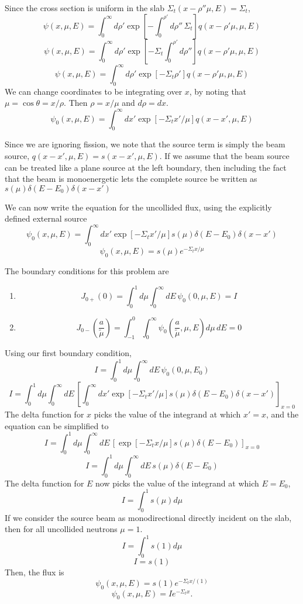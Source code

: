 \documentclass{article}
\newcommand{\Xs}{\Sigma}
\newcommand{\intzi}{\int_0^{\infty}}
\begin{document}
Since the cross section is uniform in the slab $\Xs_t(x-\rho''\mu,E) = \Xs_t$,
$$ \psi(x,\mu,E) = \intzi d\rho' \exp \left[ -\int_0^{\rho'} d\rho'' \, \Xs_t\right] q(x-\rho'\mu,\mu,E) $$
$$ \psi(x,\mu,E) = \intzi d\rho' \exp \left[ -\Xs_t \int_0^{\rho'} d\rho''\right] q(x-\rho'\mu,\mu,E) $$
$$ \psi(x,\mu,E) = \intzi d\rho' \exp \left[ -\Xs_t \rho'\right] q(x-\rho'\mu,\mu,E) $$
We can change coordinates to be integrating over $x$, by noting that $\mu = \cos\theta = x/\rho$. Then $\rho = x/\mu$ and $d\rho = dx$.
$$ \psi_0(x,\mu,E) = \intzi dx' \exp \left[ -\Xs_t x'/\mu \right] q(x-x',\mu,E) $$

Since we are ignoring fission, we note that the source term is simply the beam source, $q(x-x',\mu,E) = s(x-x',\mu,E)$. If we assume that the beam source can be treated like a plane source at the left boundary, then including the fact that the beam is monoenergetic lets the complete source be written as $s(\mu)\delta(E-E_0)\delta(x-x')$

We can now write the equation for the uncollided flux, using the explicitly defined external source
$$ \psi_0(x,\mu,E) = \intzi dx' \exp \left[ -\Xs_t x'/\mu \right] s(\mu)\delta(E-E_0)\delta(x-x') $$
$$ \psi_0(x,\mu,E) = s(\mu) e^{-\Xs_t x/\mu} $$

The boundary conditions for this problem are
\begin{enumerate}
\item $$ J_{0+}(0) = \int_0^1 d\mu \intzi dE\,  \psi_0(0,\mu,E) = I $$
\item $$ J_{0-}\left(\frac{a}{\tilde{\mu}}\right) = \int_{-1}^0 \intzi \psi_0\left(\frac{a}{\tilde{\mu}},\mu,E\right) d\mu \, dE = 0 $$
\end{enumerate}

Using our first boundary condition, 
$$ I = \int_0^1 d\mu \intzi dE\, \psi_0(0,\mu,E_0) $$
$$ I = \int_0^1 d\mu \intzi dE\, \left[ \intzi dx' \exp \left[ -\Xs_t x'/\mu \right] s(\mu)\delta(E-E_0)\delta(x-x')\right]_{x=0} $$
The delta function for $x$ picks the value of the integrand at which $x'=x$, and the equation can be simplified to
$$ I = \int_0^1 d\mu \intzi dE\, \left[ \exp \left[ -\Xs_t x/\mu \right] s(\mu)\delta(E-E_0)\right]_{x=0} $$
$$ I = \int_0^1 d\mu \intzi dE\, s(\mu)\delta(E-E_0) $$
The delta function for $E$ now picks the value of the integrand at which $E = E_0$, 
$$ I = \int_0^1 s(\mu) d\mu $$
If we consider the source beam as monodirectional directly incident on the slab, then for all uncollided neutrons $\mu = 1$.
$$ I = \int_0^1 s(1) d\mu $$
$$ I = s(1) $$
Then, the flux is
$$ \psi_0(x,\mu,E) = s(1) e^{-\Xs_t x/(1)} $$
$$\boxed{ \psi_0(x,\mu,E) = I e^{-\Xs_t x} }.$$
\end{document}
